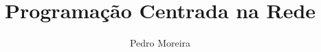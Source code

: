 \documentclass[11pt, a4paper, twoside, a4wide, headsepline, bibtotoc]{report}
\title{Programação Centrada na Rede}
\author{Pedro Moreira}
\date{\displaydate{date}}
\begin{document}

\newcommand{\code}[1]{\lstinline{#1}}
\DeclareRobustCommand{\apendices}{%
\appendixpage%
\appendix 
\renewcommand{\thechapter}{\Roman{chapter}}%
}
\end{document}
